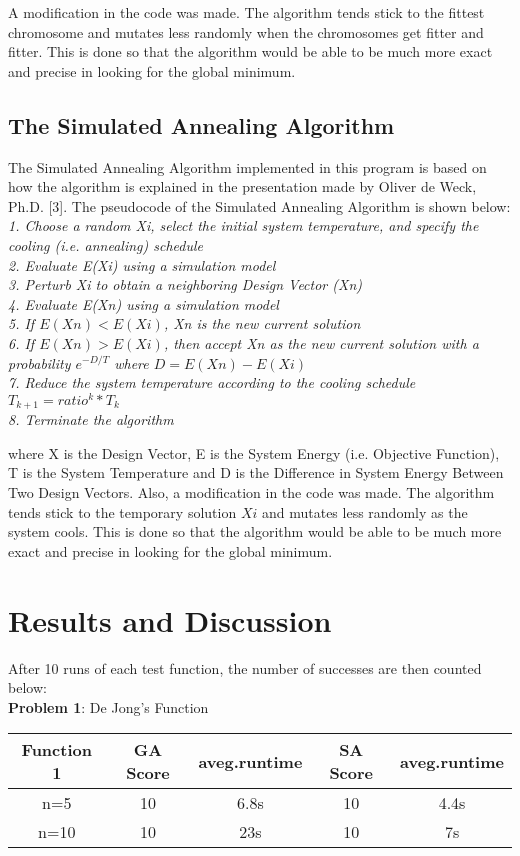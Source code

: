 \documentclass{article}
\begin{document}
A modification in the code was made. The algorithm tends stick to the fittest chromosome and mutates less randomly when the chromosomes get fitter and fitter. This is done so that the algorithm would be able to be much more exact and precise in looking for the global minimum.

\subsection{The Simulated Annealing Algorithm}
The Simulated Annealing Algorithm implemented in this program is based on how the algorithm is explained in the presentation made by Oliver de Weck, Ph.D. [3]. The pseudocode of the Simulated Annealing Algorithm is shown below:\\
\textit{
1. Choose a random Xi, select the initial system temperature, and specify the cooling (i.e. annealing) schedule\\
2. Evaluate E(Xi) using a simulation model\\
3. Perturb Xi to obtain a neighboring Design Vector (Xn)\\
4. Evaluate E(Xn) using a simulation model\\
5. If $E(Xn)< E(Xi)$, Xn is the new current solution\\
6. If $E(Xn)> E(Xi)$, then accept Xn as the new current solution with a probability $e^{-D/T}$ where $D = E(Xn) -E(Xi)$\\
7. Reduce the system temperature according to the cooling schedule $T_{k+1} = ratio^k*T_k$\\
8. Terminate the algorithm
}

where X is the Design Vector, E is the System Energy (i.e. Objective Function), T is the System Temperature and D is the Difference in System Energy Between Two Design Vectors. Also, a modification in the code was made. The algorithm tends stick to the temporary solution $Xi$ and mutates less randomly as the system cools. This is done so that the algorithm would be able to be much more exact and precise in looking for the global minimum.

\section{Results and Discussion}
After 10 runs of each test function, the number of successes are then counted below:\\

\textbf{Problem 1}: De Jong's Function\\
\begin{center}
\begin{tabular}{ |c|c|c|c|c| } 
\hline
Function 1 & GA Score & aveg.runtime & SA Score & aveg.runtime \\
\hline
\multirow{1}{3em}{n=5}
& 10 & 6.8s & 10 & 4.4s \\ 
\hline
\multirow{1}{3em}{n=10}
& 10 & 23s & 10 & 7s \\ 
\hline
\end{tabular}
\end{center}
\end{document}
